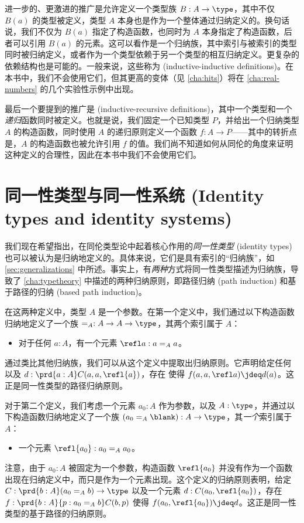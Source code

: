 %
%
进一步的、更激进的推广是允许定义一个类型族 $B:A\to \type$，其中不仅 $B(a)$ 的类型被定义，类型 $A$ 本身也是作为一个整体通过归纳定义的。换句话说，我们不仅为 $B(a)$ 指定了构造函数，也同时为 $A$ 本身指定了构造函数，后者可以引用 $B(a)$ 的元素。这可以看作是一个归纳族，其中索引与被索引的类型同时被归纳定义，或者作为一个类型依赖于另一个类型的相互归纳定义。更复杂的依赖结构也是可能的。一般来说，这些称为 (inductive-inductive definitions)。在本书中，我们不会使用它们，但其更高的变体（见 \cref{cha:hits}）将在 \cref{cha:real-numbers} 的几个实验性示例中出现。

%
%
最后一个要提到的推广是 (inductive-recursive definitions)，其中一个类型和一个\emph{递归}函数同时被定义。也就是说，我们固定一个已知类型 $P$，并给出一个归纳类型 $A$ 的构造函数，同时使用 $A$ 的递归原则定义一个函数 $f:A\to P$——其中的转折点是，$A$ 的构造函数也被允许引用 $f$ 的值。我们尚不知道如何从同伦的角度来证明这种定义的合理性，因此在本书中我们不会使用它们。

%
\section{同一性类型与同一性系统 (Identity types and identity systems)}
\label{sec:identity-systems}

%
我们现在希望指出，在同伦类型论中起着核心作用的\emph{同一性类型} (identity types) 也可以被认为是归纳地定义的。具体来说，它们是具有索引的“归纳族”，如 \cref{sec:generalizations} 中所述。事实上，有\emph{两种}方式将同一性类型描述为归纳族，导致了 \cref{cha:typetheory} 中描述的两种归纳原则，即路径归纳 (path induction) 和基于路径的归纳 (based path induction)。

在这两种定义中，类型 $A$ 是一个参数。在第一个定义中，我们通过以下构造函数归纳地定义了一个族 $=_A : A\to A\to \type$，其两个索引属于 $A$：
\begin{itemize}
    \item 对于任何 $a:A$，有一个元素 $\refl a : a=_A a$。
\end{itemize}
通过类比其他归纳族，我们可以从这个定义中提取出归纳原则。它声明给定任何  以及 $d:\prd{a:A} C(a,a,\refl{a})$，存在  使得 $f(a,a,\refl a)\jdeq d(a)$。这正是同一性类型的路径归纳原则。

对于第二个定义，我们考虑一个元素 $a_0:A$ 作为参数，以及 $A:\type$，并通过以下构造函数归纳地定义了一个族 $(a_0 =_A \blank):A\to \type$，其\emph{一个}索引属于 $A$：
\begin{itemize}
    \item 一个元素 $\refl{a_0} : a_0 =_A a_0$。
\end{itemize}
注意，由于 $a_0:A$ 被固定为一个参数，构造函数 $\refl{a_0}$ 并没有作为一个函数出现在归纳定义中，而只是作为一个元素出现。这个定义的归纳原则表明，给定 $C:\prd{b:A} (a_0 =_A b) \to \type$ 以及一个元素 $d:C(a_0,\refl{a_0})$，存在 $f:\prd{b:A}{p:a_0 =_A b} C(b,p)$ 使得 $f(a_0,\refl{a_0})\jdeq d$。这正是同一性类型的基于路径的归纳原则。

